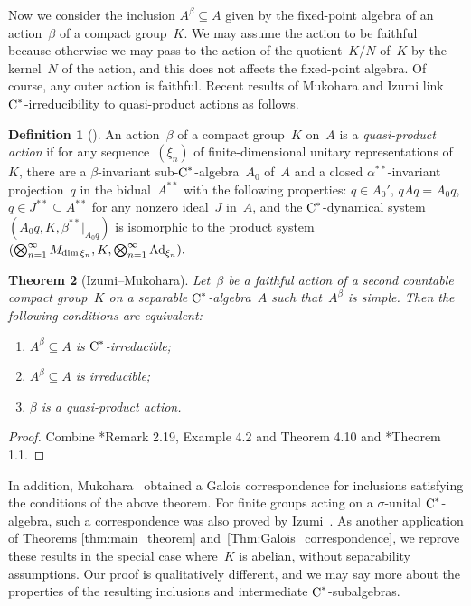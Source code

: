 \documentclass[a4paper]{amsart}
\theoremstyle{plain}
\newtheorem{theorem}{Theorem}
\theoremstyle{definition}
\newtheorem{definition}[theorem]{Definition}
\theoremstyle{remark}
\numberwithin{theorem}{section}
\numberwithin{equation}{section}
\newcommand*{\nb}{\nobreakdash}
\newcommand*{\Cst}{\textup C^*}%
\newcommand*{\Ad}{\textup{Ad}}%
\begin{document}
Now we consider the inclusion \(A^\beta\subseteq A\) given by the
fixed-point algebra of an action~\(\beta\) of a compact group~\(K\).
We may assume the action to be faithful because otherwise we may pass
to the action of the quotient~\(K/N\) of~\(K\) by the kernel~\(N\) of
the action, and this does not affects the fixed-point algebra.
Of course, any outer action is faithful. Recent results
of  Mukohara \cite{Mukohara:Inclusions} and Izumi \cite{Izumi:Minimal_compact} link \(\Cst\)\nb-irreducibility to quasi-product
actions as follows.

\begin{definition}[\cites{Bratteli-Elliott-Evans-Kishimoto:Quasi-product,
    Bratteli-Elliott-Kishimoto:Quasi-product}]
  \label{def:quasi_product_action}
  An action~\(\beta\) of a compact group~\(K\) on~\(A\) is a
  \emph{quasi-product action} if for any sequence~\((\xi_n)\)
  of finite-dimensional unitary representations of~\(K\), there are a
  \(\beta\)\nb-invariant sub-\(\Cst\)\nb-algebra~\(A_0\) of~\(A\) and
  a closed \(\alpha^{**}\)-invariant projection~\(q\) in the
  bidual~\(A^{**}\) with the following properties: \(q\in
  A_0'\), \(q A q = A_0 q\), \(q\in J^{**}\subseteq A^{**}\) for any
  nonzero ideal~\(J\) in~\(A\), and the \(\Cst\)\nb-dynamical system
  \((A_0q, K, \beta^{**}|_{A_0q})\) is isomorphic to the product
  system
  \(
    (\bigotimes_{n=1}^\infty M_{\dim \xi_n}, K,
    \bigotimes_{n=1}^\infty \Ad_{\xi_n}).
  \)
\end{definition}

\begin{theorem}[Izumi--Mukohara]
  Let~\(\beta\) be a faithful action of a second countable compact
  group~\(K\) on a separable \(\Cst\)\nb-algebra~\(A\) such
  that~\(A^\beta\) is simple.
  Then the following conditions are equivalent:
  \begin{enumerate}
  \item \(A^\beta\subseteq A\) is \(\Cst\)\nb-irreducible;
  \item \(A^\beta\subseteq A\) is irreducible;
  \item \(\beta\) is a quasi-product action.
  \end{enumerate}
\end{theorem}
\begin{proof}
Combine \cite{Mukohara:Inclusions}*{Remark 2.19, Example 4.2  and Theorem
  4.10} and   \cite{Izumi:Minimal_compact}*{Theorem 1.1}.
\end{proof}
In addition, Mukohara~\cite{Mukohara:Inclusions} obtained a Galois
correspondence for inclusions satisfying the conditions of the above
theorem.
For finite groups acting on a \(\sigma\)\nb-unital
\(\Cst\)\nb-algebra, such a correspondence was also proved by
Izumi~\cite{Izumi:Inclusions_simple}.
As another application of Theorems \ref{thm:main_theorem}
and~\ref{Thm:Galois_correspondence}, we reprove these results in the
special case where~\(K\) is abelian, without separability assumptions.
Our proof is qualitatively different, and we may say more about  the
properties of the resulting inclusions and intermediate
\(\Cst\)\nb-subalgebras.
\end{document}
